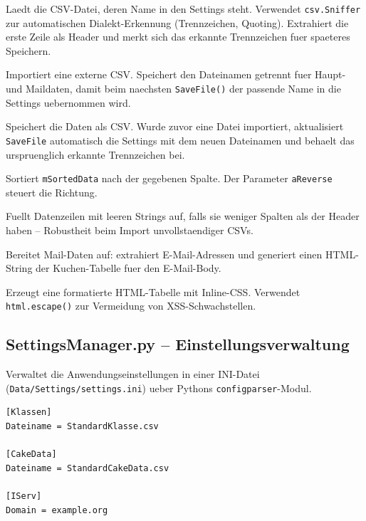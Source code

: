 \documentclass[12pt, a4paper]{article}
\begin{document}
\begin{description}[style=nextline, leftmargin=1.5em]
    \item[\texttt{LoadStandardFile(aForMainTable)}]
        Laedt die CSV-Datei, deren Name in den Settings steht. Verwendet
        \texttt{csv.Sniffer} zur automatischen Dialekt-Erkennung (Trennzeichen,
        Quoting). Extrahiert die erste Zeile als Header und merkt sich das
        erkannte Trennzeichen fuer spaeteres Speichern.
    \item[\texttt{ImportFile(aPath)}]
        Importiert eine externe CSV. Speichert den Dateinamen getrennt fuer
        Haupt- und Maildaten, damit beim naechsten \texttt{SaveFile()} der
        passende Name in die Settings uebernommen wird.
    \item[\texttt{SaveFile(aForMainTable)}]
        Speichert die Daten als CSV. Wurde zuvor eine Datei importiert,
        aktualisiert \texttt{SaveFile} automatisch die Settings mit dem
        neuen Dateinamen und behaelt das urspruenglich erkannte Trennzeichen bei.
    \item[\texttt{sortData(aSortColumnIndex, aReverse, aForMain)}]
        Sortiert \texttt{mSortedData} nach der gegebenen Spalte.
        Der Parameter \texttt{aReverse} steuert die Richtung.
    \item[\texttt{\_padRows(aData, aHeaderLen)}]
        Fuellt Datenzeilen mit leeren Strings auf, falls sie weniger Spalten
        als der Header haben -- Robustheit beim Import unvollstaendiger CSVs.
    \item[\texttt{createCompleteMailData()}]
        Bereitet Mail-Daten auf: extrahiert E-Mail-Adressen und generiert
        einen HTML-String der Kuchen-Tabelle fuer den E-Mail-Body.
    \item[\texttt{createHtmlDataString()}]
        Erzeugt eine formatierte HTML-Tabelle mit Inline-CSS. Verwendet
        \texttt{html.escape()} zur Vermeidung von XSS-Schwachstellen.
\end{description}


\subsection{SettingsManager.py -- Einstellungsverwaltung}

Verwaltet die Anwendungseinstellungen in einer INI-Datei
(\texttt{Data/Settings/settings.ini}) ueber Pythons \texttt{configparser}-Modul.

\begin{lstlisting}[language={}, caption={settings.ini -- Konfigurationsstruktur}]
[Klassen]
Dateiname = StandardKlasse.csv

[CakeData]
Dateiname = StandardCakeData.csv

[IServ]
Domain = example.org
\end{lstlisting}
\end{document}
